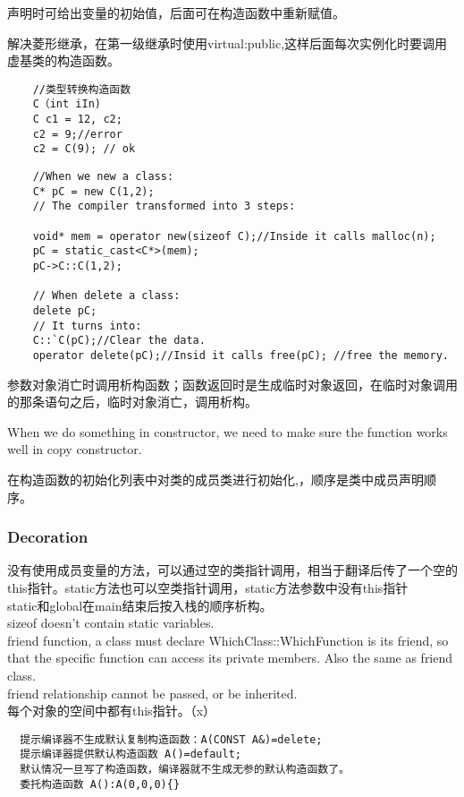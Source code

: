 \documentclass[UTF8]{../computerUniverse}
\begin{document}
声明时可给出变量的初始值，后面可在构造函数中重新赋值。


解决菱形继承，在第一级继承时使用virtual:public,这样后面每次实例化时要调用虚基类的构造函数。
\begin{lstlisting}
    //类型转换构造函数
    C（int iIn)
    C c1 = 12, c2;
    c2 = 9;//error
    c2 = C(9); // ok
\end{lstlisting}



\begin{lstlisting}
    //When we new a class: 
    C* pC = new C(1,2);
    // The compiler transformed into 3 steps:

    void* mem = operator new(sizeof C);//Inside it calls malloc(n);
    pC = static_cast<C*>(mem);
    pC->C::C(1,2);

    // When delete a class:
    delete pC;
    // It turns into:
    C::`C(pC);//Clear the data.
    operator delete(pC);//Insid it calls free(pC); //free the memory.
\end{lstlisting}



参数对象消亡时调用析构函数；函数返回时是生成临时对象返回，在临时对象调用的那条语句之后，临时对象消亡，调用析构。

When we do something in constructor, we need to make sure the function works well in copy constructor.

在构造函数的初始化列表中对类的成员类进行初始化,，顺序是类中成员声明顺序。

\subsubsection{Decoration}
没有使用成员变量的方法，可以通过空的类指针调用，相当于翻译后传了一个空的this指针。static方法也可以空类指针调用，static方法参数中没有this指针 \\
static和global在main结束后按入栈的顺序析构。\\
sizeof doesn't contain static variables.\\
friend function, a class must declare WhichClass::WhichFunction is its friend, so that the specific function can access its private members. Also the same as friend class.\\
friend relationship cannot be passed, or be inherited.\\
每个对象的空间中都有this指针。（x）\\

\begin{lstlisting}
  提示编译器不生成默认复制构造函数：A(CONST A&)=delete;
  提示编译器提供默认构造函数 A()=default;
  默认情况一旦写了构造函数，编译器就不生成无参的默认构造函数了。
  委托构造函数 A():A(0,0,0){}
\end{lstlisting}
\end{document}
